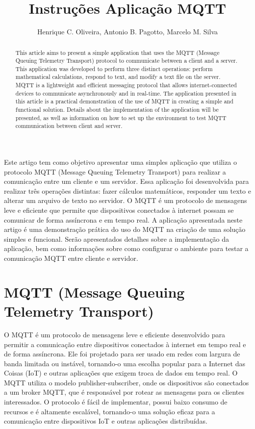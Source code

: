 \documentclass[12pt]{article}
\title{Instruções Aplicação MQTT}
\author{Henrique C. Oliveira\inst{1}, Antonio B. Pagotto\inst{1}, Marcelo M. Silva\inst{1} }
\begin{document}
 

\maketitle

\begin{abstract}
This article aims to present a simple application that uses the MQTT (Message Queuing Telemetry Transport) protocol to communicate between a client and a server. This application was developed to perform three distinct operations: perform mathematical calculations, respond to text, and modify a text file on the server. MQTT is a lightweight and efficient messaging protocol that allows internet-connected devices to communicate asynchronously and in real-time. The application presented in this article is a practical demonstration of the use of MQTT in creating a simple and functional solution. Details about the implementation of the application will be presented, as well as information on how to set up the environment to test MQTT communication between client and server.
\end{abstract}
     
\begin{resumo} 
  Este artigo tem como objetivo apresentar uma simples aplicação que utiliza o protocolo MQTT (Message Queuing Telemetry Transport) para realizar a comunicação entre um cliente e um servidor. Essa aplicação foi desenvolvida para realizar três operações distintas: fazer cálculos matemáticos, responder um texto e alterar um arquivo de texto no servidor. O MQTT é um protocolo de mensagens leve e eficiente que permite que dispositivos conectados à internet possam se comunicar de forma assíncrona e em tempo real. A aplicação apresentada neste artigo é uma demonstração prática do uso do MQTT na criação de uma solução simples e funcional. Serão apresentados detalhes sobre a implementação da aplicação, bem como informações sobre como configurar o ambiente para testar a comunicação MQTT entre cliente e servidor.
\end{resumo}


\section{MQTT (Message Queuing Telemetry Transport)}

O MQTT é um protocolo de mensagens leve e eficiente desenvolvido para permitir a comunicação entre dispositivos conectados à internet em tempo real e de forma assíncrona. Ele foi projetado para ser usado em redes com largura de banda limitada ou instável, tornando-o uma escolha popular para a Internet das Coisas (IoT) e outras aplicações que exigem troca de dados em tempo real. O MQTT utiliza o modelo publisher-subscriber, onde os dispositivos são conectados a um broker MQTT, que é responsável por rotear as mensagens para os clientes interessados. O protocolo é fácil de implementar, possui baixo consumo de recursos e é altamente escalável, tornando-o uma solução eficaz para a comunicação entre dispositivos IoT e outras aplicações distribuídas.
\end{document}
